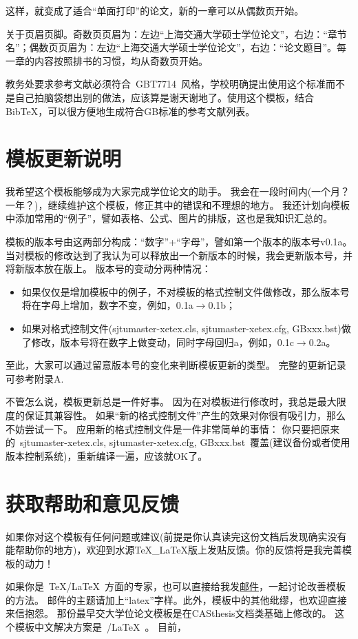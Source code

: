 这样，就变成了适合“单面打印”的论文，新的一章可以从偶数页开始。

关于页眉页脚。奇数页页眉为：左边``上海交通大学硕士学位论文''，右边：``章节名''；偶数页页眉为：左边``上海交通大学硕士学位论文''，右边：``论文题目''。每一章的内容按照排书的习惯，均从奇数页开始。

教务处要求参考文献必须符合~GBT7714~风格，学校明确提出使用这个标准而不是自己拍脑袋想出别的做法，应该算是谢天谢地了。使用这个模板，结合BibTeX，可以很方便地生成符合GB标准的参考文献列表。

\section{模板更新说明}
\label{sec:update}

我希望这个模板能够成为大家完成学位论文的助手。
我会在一段时间内(一个月？一年？)，继续维护这个模板，修正其中的错误和不理想的地方。
我还计划向模板中添加常用的``例子''，譬如表格、公式、图片的排版，这也是我知识汇总的。

模板的版本号由这两部分构成：``数字''+``字母''，譬如第一个版本的版本号v0.1a。
当对模板的修改达到了我认为可以释放出一个新版本的时候，我会更新版本号，并将新版本放在版上。
版本号的变动分两种情况：

\begin{itemize}
\item 如果仅仅是增加模板中的例子，不对模板的格式控制文件做修改，那么版本号将在字母上增加，数字不变，例如，0.1a$\rightarrow$0.1b；
\item 如果对格式控制文件(sjtumaster-xetex.cls, sjtumaster-xetex.cfg, GBxxx.bst)做了修改，版本号将在数字上做变动，同时字母回归a，例如，0.1c$\rightarrow$0.2a。
\end{itemize}

至此，大家可以通过留意版本号的变化来判断模板更新的类型。
完整的更新记录可参考附录A.

不管怎么说，模板更新总是一件好事。
因为在对模板进行修改时，我总是最大限度的保证其兼容性。
如果``新的格式控制文件''产生的效果对你很有吸引力，那么不妨尝试一下。
应用新的格式控制文件是一件非常简单的事情：
你只要把原来的~sjtumaster-xetex.cls, sjtumaster-xetex.cfg, GBxxx.bst~覆盖(建议备份或者使用版本控制系统)，重新编译一遍，应该就OK了。


\section{获取帮助和意见反馈}
\label{sec:replay}

如果你对这个模板有任何问题或建议(前提是你认真读完这份文档后发现确实没有能帮助你的地方)，欢迎到水源TeX\_LaTeX版上发贴反馈。你的反馈将是我完善模板的动力！

如果你是~\TeX/\LaTeX~方面的专家，也可以直接给我发\href{mailto:wei.jianwen@gmail.com}{邮件}，一起讨论改善模板的方法。
邮件的主题请加上``latex''字样。此外，模板中的其他纰缪，也欢迎直接来信抱怨。
那份最早交大学位论文模板是在CASthesis文档类基础上修改的。
这个模板中文解决方案是~\XeTeX/\LaTeX~。
目前，


